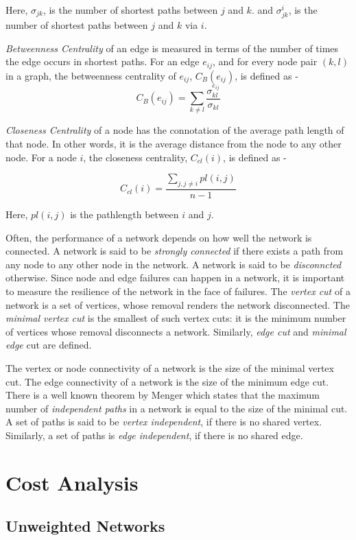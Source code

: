 \documentclass[10pt]{article}
\begin{document}
Here, $\sigma_{jk}$, is the number of shortest paths between $j$ and $k$. and $\sigma_{jk}^{i}$, is the number of shortest paths between $j$ and $k$ via $i$.

\textit{Betweenness Centrality} of an edge is measured in terms of the number of times the edge occurs in shortest paths. For an edge $e_{ij}$, and for every node pair $(k, l)$ in a graph, the betweenness centrality of $e_{ij}$, $C_{B}(e_{ij})$, is defined as - 
\[C_{B}(e_{ij}) = \sum_{k \ne l}\frac{\sigma_{kl}^{e_{ij}}}{\sigma_{kl}}\]

\textit{Closeness Centrality} of a node has the connotation of the average path length of that node. In other words, it is the average distance from the node to any other node. For a node $i$, the closeness centrality, $C_{cl}(i)$, is defined as -

\[C_{cl}(i) = \frac{\sum_{j, j \ne i} pl(i, j)}{n - 1}\]

Here, $pl(i, j)$ is the pathlength between $i$ and $j$.

Often, the performance of a network depends on how well the network is connected. A network is said to be \textit{strongly connected} if there exists a path from any node to any other node in the network. A network is said to be \textit{disconncted} otherwise. Since node and edge failures can happen in a network, it is important to measure the resilience of the network in the face of failures. The \textit{vertex cut} of a network is a set of vertices, whose removal renders the network disconnected. The \textit{minimal vertex cut} is the smallest of such vertex cuts: it is the minimum number of vertices whose removal disconnects a network. Similarly, \textit{edge cut} and \textit{minimal edge} cut are defined.

The vertex or node connectivity of a network is the size of the minimal vertex cut. The edge connectivity of a network is the size of the minimum edge cut. There is a well known theorem by Menger which states that the maximum number of \textit{independent paths} in a network is equal to the size of the minimal cut. A set of paths is said to be \textit{vertex independent}, if there is no shared vertex. Similarly, a set of paths is \textit{edge independent}, if there is no shared edge. 


\section{Cost Analysis}\label{sec:cost}

\subsection{Unweighted Networks}
\end{document}
